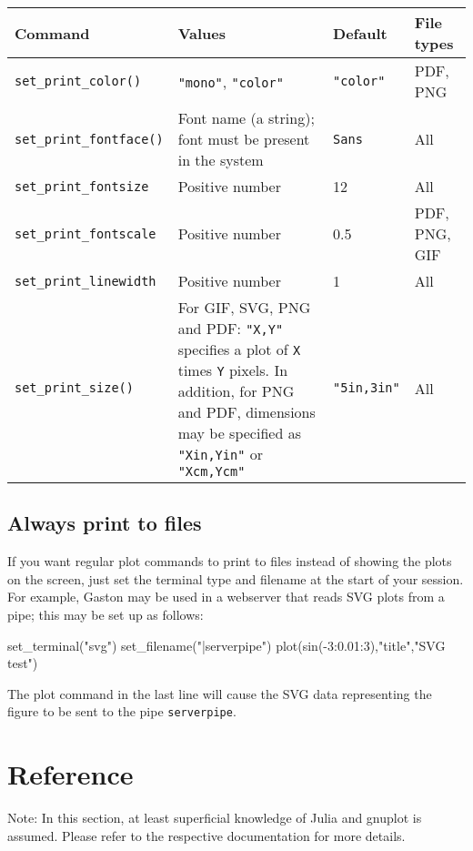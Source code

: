 \documentclass[11pt]{article}
\newcommand{\cmd}[1]{\texttt{#1}}
\begin{document}
\begin{center}
\begin{tabular}{lp{4cm}ll}
	\toprule
	\textbf{Command} & \textbf{Values} & \textbf{Default} & \textbf{File types}
	\\
	\midrule
	\cmd{set\_print\_color()} & \cmd{"mono"}, \cmd{"color"} & \cmd{"color"} &
	PDF, PNG \\
	\cmd{set\_print\_fontface()} & Font name (a string); font must be present
	in the system & \cmd{Sans} & All \\
	\cmd{set\_print\_fontsize} & Positive number & 12 & All \\
	\cmd{set\_print\_fontscale} & Positive number & 0.5 & PDF, PNG, GIF \\
	\cmd{set\_print\_linewidth} & Positive number & 1 & All \\
	\cmd{set\_print\_size()} & For GIF, SVG, PNG and PDF: \cmd{"X,Y"} specifies
	a plot of
	\cmd{X} times \cmd{Y} pixels. In addition, for PNG and PDF, dimensions may
	be specified as \cmd{"Xin,Yin"} or \cmd{"Xcm,Ycm"} & \cmd{"5in,3in"} & All
	\\
	\bottomrule
\end{tabular}
\end{center}

\subsection{Always print to files}

If you want regular plot commands to print to files instead of showing the
plots on the screen, just set the terminal type and filename at the start of
your session. For example, Gaston may be used in a webserver that reads SVG
plots from a pipe; this may be set up as follows:
\begin{juliacode}
set_terminal("svg")
set_filename("|serverpipe")
plot(sin(-3:0.01:3),"title","SVG test")
\end{juliacode}
The plot command in the last line will cause the SVG data representing the
figure to be sent to the pipe \cmd{serverpipe}.

\section{Reference}
\label{refer}

Note: In this section, at least superficial knowledge of Julia and gnuplot is
assumed. Please refer to the respective documentation for more details.
\end{document}

